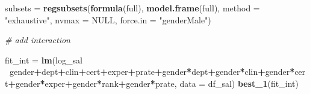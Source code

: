 \documentclass[]{article}
\newenvironment{Shaded}{\begin{snugshade}}{\end{snugshade}}
\newcommand{\CommentTok}[1]{\textcolor[rgb]{0.56,0.35,0.01}{\textit{#1}}}
\newcommand{\DataTypeTok}[1]{\textcolor[rgb]{0.13,0.29,0.53}{#1}}
\newcommand{\KeywordTok}[1]{\textcolor[rgb]{0.13,0.29,0.53}{\textbf{#1}}}
\newcommand{\NormalTok}[1]{#1}
\newcommand{\OperatorTok}[1]{\textcolor[rgb]{0.81,0.36,0.00}{\textbf{#1}}}
\newcommand{\OtherTok}[1]{\textcolor[rgb]{0.56,0.35,0.01}{#1}}
\newcommand{\StringTok}[1]{\textcolor[rgb]{0.31,0.60,0.02}{#1}}
\begin{document}
\begin{Shaded}
\begin{Highlighting}[]
\NormalTok{subsets =}\StringTok{ }\KeywordTok{regsubsets}\NormalTok{(}\KeywordTok{formula}\NormalTok{(full), }\KeywordTok{model.frame}\NormalTok{(full), }\DataTypeTok{method =} \StringTok{"exhaustive"}\NormalTok{, }\DataTypeTok{nvmax =} \OtherTok{NULL}\NormalTok{, }\DataTypeTok{force.in =} \StringTok{"genderMale"}\NormalTok{)}

\CommentTok{# add interaction}

\NormalTok{fit_int =}\StringTok{ }\KeywordTok{lm}\NormalTok{(log_sal }\OperatorTok{~}\NormalTok{gender}\OperatorTok{+}\NormalTok{dept}\OperatorTok{+}\NormalTok{clin}\OperatorTok{+}\NormalTok{cert}\OperatorTok{+}\NormalTok{exper}\OperatorTok{+}\NormalTok{prate}\OperatorTok{+}\NormalTok{gender}\OperatorTok{*}\NormalTok{dept}\OperatorTok{+}\NormalTok{gender}\OperatorTok{*}\NormalTok{clin}\OperatorTok{+}\NormalTok{gender}\OperatorTok{*}\NormalTok{cert}\OperatorTok{+}\NormalTok{gender}\OperatorTok{*}\NormalTok{exper}\OperatorTok{+}\NormalTok{gender}\OperatorTok{*}\NormalTok{rank}\OperatorTok{+}\NormalTok{gender}\OperatorTok{*}\NormalTok{prate, }\DataTypeTok{data =}\NormalTok{ df_sal)}
\KeywordTok{best_1}\NormalTok{(fit_int)}
\end{Highlighting}
\end{Shaded}
\end{document}
